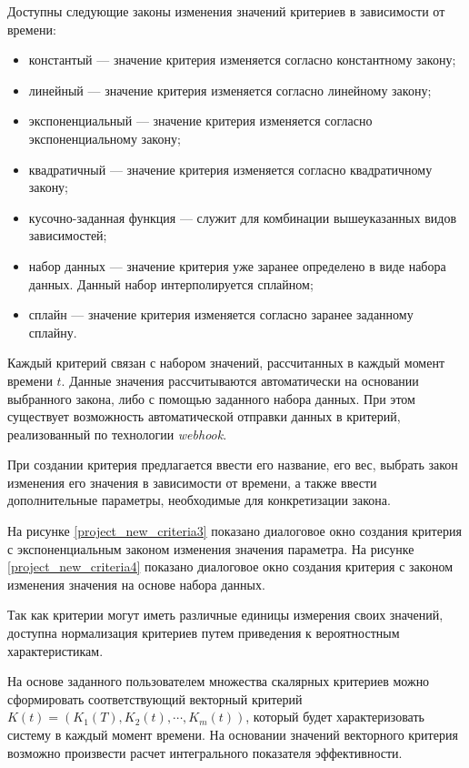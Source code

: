 Доступны следующие законы изменения значений критериев в зависимости от времени:
\begin{itemize}
    \item константый --- значение критерия изменяется согласно константному закону;
    \item линейный --- значение критерия изменяется согласно линейному закону;
    \item экспоненциальный --- значение критерия изменяется согласно экспоненциальному закону;
    \item квадратичный --- значение критерия изменяется согласно квадратичному закону;
    \item кусочно-заданная функция --- служит для комбинации вышеуказанных видов зависимостей;
    \item набор данных --- значение критерия уже заранее определено в виде набора данных. Данный набор интерполируется сплайном;
    \item сплайн --- значение критерия изменяется согласно заранее заданному сплайну.
\end{itemize}

Каждый критерий связан с набором значений, рассчитанных в каждый момент времени $t$. 
Данные значения рассчитываются автоматически на основании выбранного закона, либо с помощью заданного набора данных.
При этом существует возможность автоматической отправки данных в критерий, реализованный по технологии \emph{webhook}.

При создании критерия предлагается ввести его название, его вес, выбрать закон изменения его значения в зависимости от времени, 
а также ввести дополнительные параметры, необходимые для конкретизации закона.

На рисунке \ref{project_new_criteria3} показано диалоговое окно создания критерия с экспоненциальным законом изменения значения параметра.
На рисунке \ref{project_new_criteria4} показано диалоговое окно создания критерия с законом изменения значения на основе набора данных.


Так как критерии могут иметь различные единицы измерения своих значений, доступна нормализация критериев путем приведения к вероятностным характеристикам.

На основе заданного пользователем множества скалярных критериев можно сформировать соответствующий векторный критерий $K(t)=(K_1(T), K_2(t), \cdots, K_m(t))$, 
который будет характеризовать систему в каждый момент времени. 
На основании значений векторного критерия возможно произвести расчет интегрального показателя эффективности.

